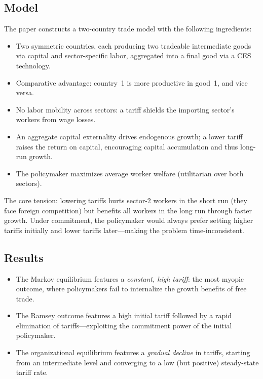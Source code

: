 \documentclass[12pt]{article}
\begin{document}
\subsection{Model}

The paper constructs a two-country trade model with the following ingredients:
\begin{itemize}
  \item Two symmetric countries, each producing two tradeable intermediate goods
    via capital and sector-specific labor, aggregated into a final good via a CES
    technology.
  \item Comparative advantage: country~1 is more productive in good~1, and vice
    versa.
  \item No labor mobility across sectors: a tariff shields the importing sector's
    workers from wage losses.
  \item An aggregate capital externality drives endogenous growth; a lower tariff
    raises the return on capital, encouraging capital accumulation and thus
    long-run growth.
  \item The policymaker maximizes average worker welfare (utilitarian over both
    sectors).
\end{itemize}

The core tension: lowering tariffs hurts sector-2 workers in the short run (they
face foreign competition) but benefits all workers in the long run through faster
growth.  Under commitment, the policymaker would always prefer setting higher
tariffs initially and lower tariffs later---making the problem time-inconsistent.

\subsection{Results}

\begin{itemize}
  \item The Markov equilibrium features a \emph{constant, high tariff}: the most myopic
    outcome, where policymakers fail to internalize the growth benefits of free trade.
  \item The Ramsey outcome features a high initial tariff followed by a rapid elimination
    of tariffs---exploiting the commitment power of the initial policymaker.
  \item The organizational equilibrium features a \emph{gradual decline} in tariffs,
    starting from an intermediate level and converging to a low (but positive)
    steady-state tariff rate.
\end{itemize}
\end{document}
